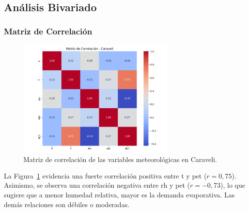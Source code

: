 \subsection{Análisis Bivariado}

\subsubsection*{Matriz de Correlación}
\begin{figure}[htbp]
\centering
\includegraphics[width=0.7\textwidth]{resultados/por_estacion_meteorologica/Caraveli/matriz_correlacion.png}
\caption{Matriz de correlación de las variables meteorológicas en Caraveli.}
\label{fig:caraveli_corr}
\end{figure}
La Figura~\ref{fig:caraveli_corr} evidencia una fuerte correlación positiva entre \gls{t} y \gls{pet} (\(r = 0{,}75\)). Asimismo, se observa una correlación negativa entre \gls{rh} y \gls{pet} (\(r = -0{,73}\)), lo que sugiere que a menor humedad relativa, mayor es la demanda evaporativa. Las demás relaciones son débiles o moderadas.


